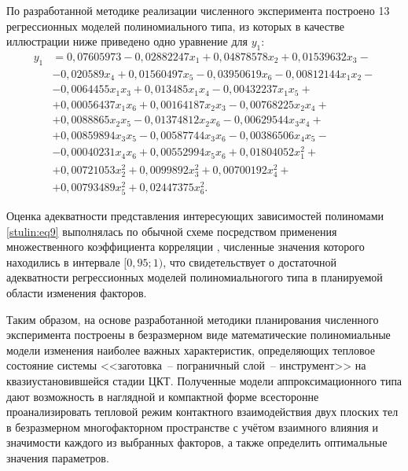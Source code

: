 По разработанной методике реализации численного эксперимента построено 13
регрессионных моделей полиномиального типа, из которых в качестве
иллюстрации ниже приведено одно уравнение для $y_1$:
\begin{equation}
\label{stulin:eq13}
\begin{aligned}
 y_1 &=0,07605973-0,02882247x_1 +0,04878578x_2 +0,01539632x_3 - \\
 &-0,020589x_4 +0,01560497x_5 -0,03950619x_6 -0,00812144x_1 x_2 - \\
&-0,0064455x_1 x_3 +0,013485x_1 x_4 -0,00432237x_1 x_5 +\\
&+0,00056437x_1 x_6 + 0,00164187x_2 x_3 -0,00768225x_2 x_4 + \\
&+0,0088865x_2 x_5 -0,01374812x_2 x_6 - 0,00629544x_3 x_4 + \\
&+0,00859894x_3 x_5 -0,00587744x_3 x_6 -0,00386506x_4 x_5 - \\
&-0,00040231x_4 x_6 +0,00552994x_5 x_6 +0,01804052x_1^2 +\\
&+0,00721053x_2^2 + 0,0099892x_3^2 +0,00700192x_4^2 + \\
&+0,00793489x_5^2 +0,02447375x_6^2 .
\end{aligned}
\end{equation}

Оценка адекватности представления интересующих зависимостей
полиномами \eqref{stulin:eq9} выполнялась по обычной схеме
посредством применения множественного коэффициента корреляции \cite{stulin:bib5},
численные значения которого находились в интервале $[0,95; 1)$, что
свидетельствует о достаточной адекватности регрессионных моделей
полиномиальногого типа в планируемой области изменения факторов.

Таким образом, на основе разработанной методики планирования
численного эксперимента построены в безразмерном виде
математические полиномиальные модели изменения наиболее важных
характеристик, определяющих тепловое состояние системы <<заготовка~-- пограничный слой~-- инструмент>> на квазиустановившейся
стадии ЦКТ. Полученные модели аппроксимационного типа дают
возможность в наглядной и компактной форме всесторонне
проанализировать тепловой режим контактного взаимодействия двух
плоских тел в безразмерном многофакторном пространстве с учётом
взаимного влияния и значимости каждого из выбранных факторов, а
также определить оптимальные значения параметров.

